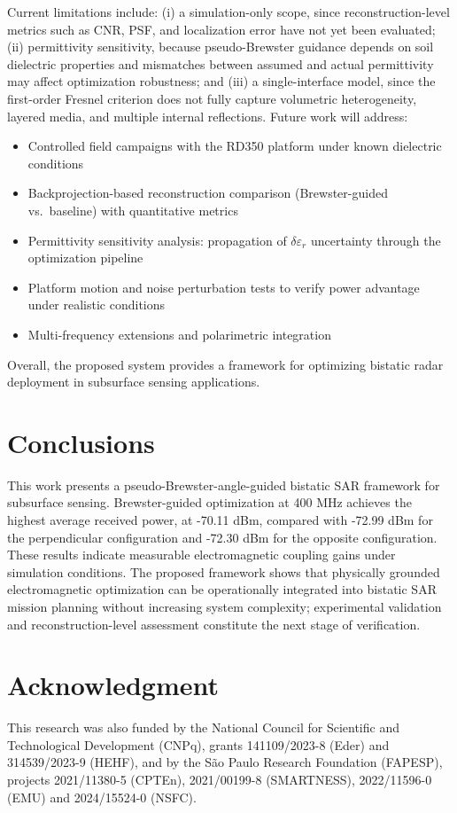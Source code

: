 \documentclass[conference]{IEEEtran}
\begin{document}
Current limitations include: (i) a simulation-only scope, since reconstruction-level metrics such as CNR, PSF, and localization error have not yet been evaluated; (ii) permittivity sensitivity, because pseudo-Brewster guidance depends on soil dielectric properties and mismatches between assumed and actual permittivity may affect optimization robustness; and (iii) a single-interface model, since the first-order Fresnel criterion does not fully capture volumetric heterogeneity, layered media, and multiple internal reflections. Future work will address:

\begin{itemize}
\item Controlled field campaigns with the RD350 platform under known dielectric conditions
\item Backprojection-based reconstruction comparison (Brewster-guided vs.\ baseline) with quantitative metrics
\item Permittivity sensitivity analysis: propagation of $\delta\varepsilon_r$ uncertainty through the optimization pipeline
\item Platform motion and noise perturbation tests to verify power advantage under realistic conditions
\item Multi-frequency extensions and polarimetric integration
\end{itemize}

Overall, the proposed system provides a framework for optimizing bistatic radar deployment in subsurface sensing applications.

\section{Conclusions}
This work presents a pseudo-Brewster-angle-guided bistatic SAR framework for subsurface sensing. Brewster-guided optimization at 400 MHz achieves the highest average received power, at -70.11 dBm, compared with -72.99 dBm for the perpendicular configuration and -72.30 dBm for the opposite configuration. These results indicate measurable electromagnetic coupling gains under simulation conditions. The proposed framework shows that physically grounded electromagnetic optimization can be operationally integrated into bistatic SAR mission planning without increasing system complexity; experimental validation and reconstruction-level assessment constitute the next stage of verification.

\section *{Acknowledgment}
This research was also funded by the National Council for Scientific and Technological Development (CNPq), grants 141109/2023-8 (Eder) and 314539/2023-9 (HEHF), and by the São Paulo Research Foundation (FAPESP), projects 2021/11380-5 (CPTEn), 2021/00199-8 (SMARTNESS),
2022/11596-0 (EMU) and 2024/15524-0 (NSFC).
\end{document}
